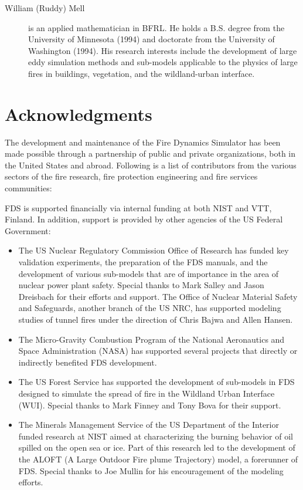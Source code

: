 \documentclass[11pt]{book}
\begin{document}
\begin{description}
\item[William (Ruddy) Mell] is an applied mathematician in BFRL. He holds a B.S. degree from the University of Minnesota (1994) and doctorate from the University of Washington (1994). His research interests include the development of large eddy simulation methods and sub-models applicable to the physics of large fires in buildings, vegetation, and the wildland-urban interface.
\end{description}


\chapter{Acknowledgments}

\label{acksection}

The development and maintenance of the Fire Dynamics Simulator has been made possible through
a partnership of public and private organizations, both in the United States and abroad. Following
is a list of contributors from the various sectors of the fire research, fire protection engineering and
fire services communities:

FDS is supported financially via internal funding at both NIST and
VTT, Finland. In addition, support is provided by other agencies of
the US Federal Government:
\begin{itemize}
\item The US Nuclear Regulatory Commission Office of Research has funded key
validation experiments, the preparation of the FDS manuals, and the
development of various sub-models that are of importance in the area
of nuclear power plant safety. Special thanks to Mark Salley and Jason
Dreisbach for their efforts and support.  The Office of Nuclear
Material Safety and Safeguards, another branch of the US NRC, has
supported modeling studies of tunnel fires under the direction of
Chris Bajwa and Allen Hansen.
\item The Micro-Gravity Combustion Program of the National Aeronautics and Space
Administration (NASA) has supported several projects that directly or indirectly benefited FDS development.
\item The US Forest Service has supported the development of sub-models in FDS designed to simulate the spread of
fire in the Wildland Urban Interface (WUI). Special thanks to Mark Finney and Tony Bova for their support.
\item The Minerals Management Service of the US Department of the Interior funded research at NIST aimed at
characterizing the burning behavior of oil spilled on the open sea or ice. Part of this research led to the development
of the ALOFT (A Large Outdoor Fire plume Trajectory) model, a forerunner of FDS. Special thanks to Joe Mullin for his
encouragement of the modeling efforts.
\end{itemize}
\end{document}
